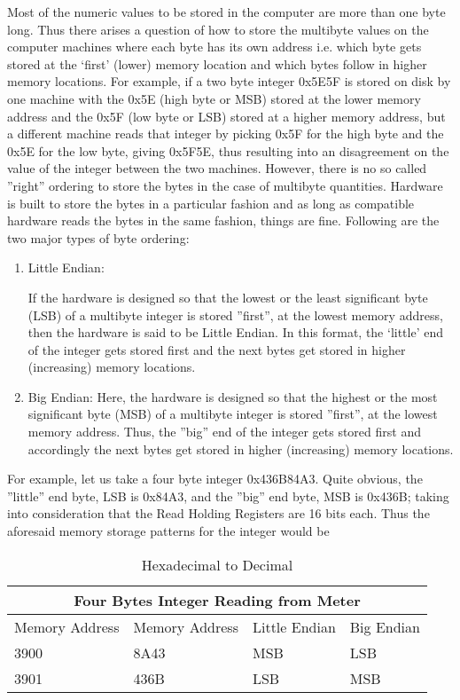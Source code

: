 Most of the numeric values to be stored in the computer are more than one byte long. Thus there arises a question of how to store the multibyte values on the computer machines where each byte has its own address i.e. which byte gets stored at the ‘first’ (lower) memory location and which bytes follow in higher memory locations. For example, if a two byte integer 0x5E5F is stored on disk by one machine with the 0x5E (high byte or MSB) stored at the lower memory address and the 0x5F (low byte or LSB) stored at a higher memory address, but a different machine reads that integer by picking 0x5F for the high byte and the 0x5E for the low byte, giving 0x5F5E, thus resulting into an disagreement on the value of the integer between the two machines.  
However, there is no so called ''right'' ordering to store the bytes in the case of multibyte quantities. Hardware is built to store the bytes in a particular fashion and as long as compatible hardware reads the bytes in the same fashion, things are fine. Following are the two major types of byte ordering:
\begin{enumerate}
\item Little Endian:

If the hardware is designed so that the lowest or the least significant byte (LSB) of a multibyte integer is stored ''first'', at the lowest memory address, then the hardware is said to be Little Endian. In this format, the ‘little’ end of the integer gets stored first and the next bytes get stored in higher (increasing) memory locations. 
\item Big Endian:
Here, the hardware is designed so that the highest or the most significant byte (MSB) of a multibyte integer is stored ''first'', at the lowest memory address. Thus, the ''big'' end of the integer gets stored first and accordingly the next bytes get stored in higher (increasing) memory locations. 
\end{enumerate}
For example, let us take a four byte integer 0x436B84A3. Quite obvious, the ''little'' end byte, LSB is 0x84A3, and the ''big'' end byte, MSB is 0x436B; taking into consideration that the Read Holding Registers are 16 bits each. Thus the aforesaid memory storage patterns for the integer would be 

\begin{table}
\centering
\caption{Hexadecimal to Decimal}
\label{tab:ieee-decimal}
\begin{tabular}{ |p{3cm}|p{3cm}|p{3cm}|p{3cm}|}

\hline
\multicolumn{4}{|c|}{Four Bytes Integer Reading from Meter} \\
\hline

            Memory Address & Memory Address & Little Endian & Big Endian \\ \hline
            3900 & 8A43 & MSB & LSB \\
            3901 & 436B & LSB & MSB \\ \hline
          \end{tabular}
\end{table}


